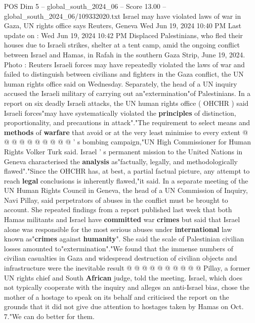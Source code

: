 \begin{textsample}{POS Dim 5 – global\_south\_2024\_06 – Score 13.00 – global\_south\_2024\_06/109332020.txt}  \label{ex:f5_pos_229}
Israel may have violated laws of war in Gaza, UN rights office says Reuters, Geneva Wed Jun 19, 2024 10:40 PM Last update on : Wed Jun 19, 2024 10:42 PM Displaced Palestinians, who fled their houses due to Israeli strikes, shelter at a tent camp, amid the ongoing conflict between Israel and Hamas, in Rafah in the southern Gaza Strip, June 19, 2024.
Photo : Reuters Israeli forces may have repeatedly violated the laws of war and failed to distinguish between civilians and fighters in the Gaza conflict, the UN human rights office said on Wednesday.
Separately, the head of a UN inquiry accused the Israeli military of carrying out an"extermination"of Palestinians.
In a report on six deadly Israeli attacks, the UN human rights office ( OHCHR ) said Israeli forces"may have systematically violated the \textbf{principles} of distinction, proportionality, and precautions in attack"."The requirement to select means and \textbf{methods} of \textbf{warfare} that avoid or at the very least minimise to every extent @ @ @ @ @ @ @ @ @ @ ' s bombing campaign,"UN High Commissioner for Human Rights Volker Turk said.
Israel ' s permanent mission to the United Nations in Geneva characterised the \textbf{analysis} as"factually, legally, and methodologically flawed"."Since the OHCHR has, at best, a partial factual picture, any attempt to reach \textbf{legal} conclusions is inherently flawed,"it said.
In a separate meeting of the UN Human Rights Council in Geneva, the head of a UN Commission of Inquiry, Navi Pillay, said perpetrators of abuses in the conflict must be brought to account.
She repeated findings from a report published last week that both Hamas militants and Israel have \textbf{committed} war \textbf{crimes} but said that Israel alone was responsible for the most serious abuses under \textbf{international} law known as"\textbf{crimes} against \textbf{humanity}".
She said the scale of Palestinian civilian losses amounted to"extermination"."We found that the immense numbers of civilian casualties in Gaza and widespread destruction of civilian objects and infrastructure were the inevitable result @ @ @ @ @ @ @ @ @ @ Pillay, a former UN rights chief and South \textbf{African} judge, told the meeting.
Israel, which does not typically cooperate with the inquiry and alleges an anti-Israel bias, chose the mother of a hostage to speak on its behalf and criticised the report on the grounds that it did not give due attention to hostages taken by Hamas on Oct. 7."We can do better for them.

\end{textsample}
